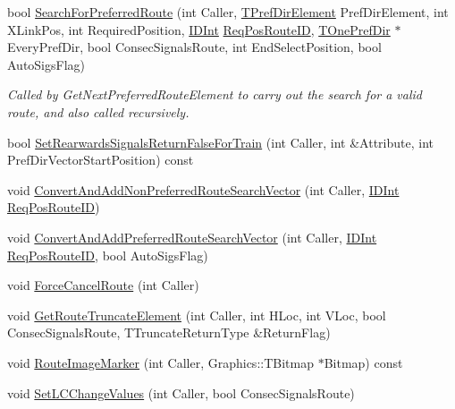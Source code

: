 \begin{DoxyCompactItemize}
\mbox{\label{class_t_one_route_a78f476e2ae0584ef8873414b53fd09b4}} 
bool \mbox{\hyperlink{class_t_one_route_a78f476e2ae0584ef8873414b53fd09b4}{Search\+For\+Preferred\+Route}} (int Caller, \mbox{\hyperlink{class_t_pref_dir_element}{T\+Pref\+Dir\+Element}} Pref\+Dir\+Element, int X\+Link\+Pos, int Required\+Position, \mbox{\hyperlink{class_i_d_int}{I\+D\+Int}} \mbox{\hyperlink{class_t_one_route_aee7b2c91e9920bbb59c84cb562f0680a}{Req\+Pos\+Route\+ID}}, \mbox{\hyperlink{class_t_one_pref_dir}{T\+One\+Pref\+Dir}} $\ast$Every\+Pref\+Dir, bool Consec\+Signals\+Route, int End\+Select\+Position, bool Auto\+Sigs\+Flag)
\begin{DoxyCompactList}\small\item\em Called by Get\+Next\+Preferred\+Route\+Element to carry out the search for a valid route, and also called recursively. \end{DoxyCompactList}\item 
bool \mbox{\hyperlink{class_t_one_route_a55e04e36f652344b5215f8a28143c4a3}{Set\+Rearwards\+Signals\+Return\+False\+For\+Train}} (int Caller, int \&Attribute, int Pref\+Dir\+Vector\+Start\+Position) const
\item 
void \mbox{\hyperlink{class_t_one_route_a53496c398dcdb3a644801c4e74d47d01}{Convert\+And\+Add\+Non\+Preferred\+Route\+Search\+Vector}} (int Caller, \mbox{\hyperlink{class_i_d_int}{I\+D\+Int}} \mbox{\hyperlink{class_t_one_route_aee7b2c91e9920bbb59c84cb562f0680a}{Req\+Pos\+Route\+ID}})
\item 
void \mbox{\hyperlink{class_t_one_route_a36ba8adc8b4a47908ee4e1b8e75792ca}{Convert\+And\+Add\+Preferred\+Route\+Search\+Vector}} (int Caller, \mbox{\hyperlink{class_i_d_int}{I\+D\+Int}} \mbox{\hyperlink{class_t_one_route_aee7b2c91e9920bbb59c84cb562f0680a}{Req\+Pos\+Route\+ID}}, bool Auto\+Sigs\+Flag)
\item 
void \mbox{\hyperlink{class_t_one_route_a491fff1e619a9dc79774acf85eed72a5}{Force\+Cancel\+Route}} (int Caller)
\item 
void \mbox{\hyperlink{class_t_one_route_ae131609dd8248dae2d7b699ab8777202}{Get\+Route\+Truncate\+Element}} (int Caller, int H\+Loc, int V\+Loc, bool Consec\+Signals\+Route, T\+Truncate\+Return\+Type \&Return\+Flag)
\item 
void \mbox{\hyperlink{class_t_one_route_aa36c801460b594ec96af1779d633d739}{Route\+Image\+Marker}} (int Caller, Graphics\+::\+T\+Bitmap $\ast$Bitmap) const
\item 
void \mbox{\hyperlink{class_t_one_route_a92dbe2a2df334da0b20e54683c0fba8e}{Set\+L\+C\+Change\+Values}} (int Caller, bool Consec\+Signals\+Route)

\end{DoxyCompactItemize}

